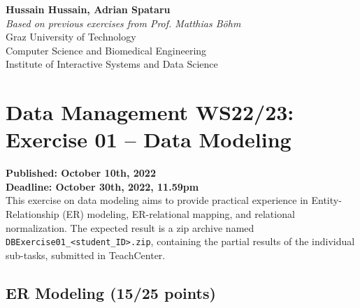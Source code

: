 \documentclass[
        a4paper,
        pdftex,
        english, 
        oneside,%
        listof=totoc,%
        bibliography=totoc, %
        titlepage,
        abstracton 
]{scrartcl} %
\begin{document}
	

\frenchspacing


\begin{flushleft}
\noindent \textbf{Hussain Hussain, Adrian Spataru}\\
\textit{Based on previous exercises from Prof. Matthias B\"ohm} \\
Graz University of Technology\\
Computer Science and Biomedical Engineering\\
Institute of Interactive Systems and Data Science\\
\end{flushleft}

\bigskip

\setcounter{section}{0}
\section{Data Management WS22/23: Exercise 01 -- Data Modeling}
\noindent \textbf{Published: October 10th, 2022}\\
\noindent \textbf{Deadline: October 30th, 2022, 11.59pm}\\

\noindent This exercise on data modeling aims to provide practical experience in Entity-Relationship (ER) modeling, ER-relational mapping, and relational normalization. The expected result is a zip archive named \texttt{DBExercise01\_<student\_ID>.zip}, containing the partial results of the individual sub-tasks, submitted in TeachCenter.

\subsection{ER Modeling (15/25 points)}
\label{sec:ER}
\end{document}

